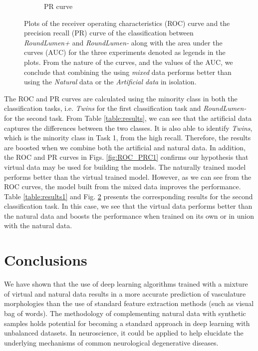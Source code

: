 \begin{figure}[ht!]
\begin{subfigure}[t]{0.5\textwidth}
  \caption{PR curve }
        \label{fig:PRC2}
    \end{subfigure}%
    \caption{Plots of the receiver operating characteristics (ROC) curve and the precision recall (PR) curve of the classification between \textit{RoundLumen+} and \textit{RoundLumen-} along with the area under the curves (AUC) for the three experiments denoted as legends in the plots. From the nature of the curves, and the values of the AUC, we conclude that combining the using \textit{mixed} data performs better than using the \textit{Natural} data or the \textit{Artificial data} in isolation.}
    \label{fig:ROC_PRC2}
\end{figure}

The ROC and PR curves are calculated using the minority class in both the classification tasks, i.e. \textit{Twins} for the first classification task and \textit{RoundLumen-} for the second task.
From Table \ref{table:results}, we can see that the artificial data captures the differences between the two classes. It is also able to identify \textit{Twins}, which is the minority class in Task 1, from the high recall. Therefore, the results are boosted when we combine both the artificial and natural data. In addition, the ROC and PR curves in Figs. \ref{fig:ROC_PRC1} confirms our hypothesis that virtual data may be used for building the models. The naturally trained model performs better than the virtual trained model. However, as we can see from the ROC curves, the model built from the mixed data improves the performance. Table \ref{table:results1} and Fig.  \ref{fig:ROC_PRC2} presents the corresponding results for the second classification task. In this case, we see that the virtual data performs better than the natural data and boosts the performance when trained on its own or in union with the natural data.

\section{Conclusions}
We have shown that the use of deep learning algorithms  trained with a mixture of virtual and natural data  results in a more accurate prediction of vasculature morphologies than the use of standard feature extraction methods (such as visual bag of words). The methodology of complementing natural data with synthetic samples holds potential for becoming a standard approach in deep learning with unbalanced datasets. In neuroscience, it could be applied to help elucidate the underlying mechanisms of common neurological degenerative diseases.